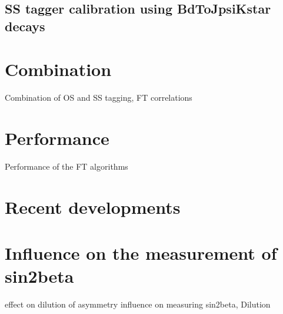 \subsection{\ac{SS} tagger calibration using BdToJpsiKstar decays}
\label{sec:flavour_tagging:calibration:ss}

\section{Combination}
\label{sec:flavour_tagging:combination}
Combination of OS and SS tagging, FT correlations

\section{Performance}
\label{sec:flavour_tagging:performance}
Performance of the FT algorithms

\section{Recent developments}
\label{sec:flavour_tagging:developments}

\section{Influence on the measurement of sin2beta}
\label{sec:flavour_tagging:sin2beta}
effect on dilution of asymmetry
influence on measuring sin2beta, Dilution
